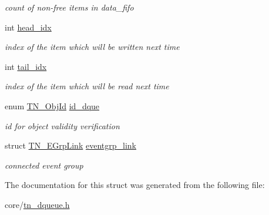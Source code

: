 \begin{DoxyCompactItemize}
\begin{DoxyCompactList}\small\item\em count of non-\/free items in {\ttfamily data\+\_\+fifo} \end{DoxyCompactList}\item 
\hypertarget{structTN__DQueue_a3451096f72cc02a2bed5573c2457323e}{int \hyperlink{structTN__DQueue_a3451096f72cc02a2bed5573c2457323e}{head\+\_\+idx}}\label{structTN__DQueue_a3451096f72cc02a2bed5573c2457323e}

\begin{DoxyCompactList}\small\item\em index of the item which will be written next time \end{DoxyCompactList}\item 
\hypertarget{structTN__DQueue_ab5451b7c143d4208c36d4227b79732a0}{int \hyperlink{structTN__DQueue_ab5451b7c143d4208c36d4227b79732a0}{tail\+\_\+idx}}\label{structTN__DQueue_ab5451b7c143d4208c36d4227b79732a0}

\begin{DoxyCompactList}\small\item\em index of the item which will be read next time \end{DoxyCompactList}\item 
\hypertarget{structTN__DQueue_afce2b73b8afc3b1537e34ff3a4a7114c}{enum \hyperlink{tn__common_8h_ae779dd1f6735f6e139fb70acd004d976}{T\+N\+\_\+\+Obj\+Id} \hyperlink{structTN__DQueue_afce2b73b8afc3b1537e34ff3a4a7114c}{id\+\_\+dque}}\label{structTN__DQueue_afce2b73b8afc3b1537e34ff3a4a7114c}

\begin{DoxyCompactList}\small\item\em id for object validity verification \end{DoxyCompactList}\item 
\hypertarget{structTN__DQueue_a4c7d686c2f9f6a6bc2f875e1c4849ae1}{struct \hyperlink{structTN__EGrpLink}{T\+N\+\_\+\+E\+Grp\+Link} \hyperlink{structTN__DQueue_a4c7d686c2f9f6a6bc2f875e1c4849ae1}{eventgrp\+\_\+link}}\label{structTN__DQueue_a4c7d686c2f9f6a6bc2f875e1c4849ae1}

\begin{DoxyCompactList}\small\item\em connected event group \end{DoxyCompactList}\end{DoxyCompactItemize}


The documentation for this struct was generated from the following file\+:\begin{DoxyCompactItemize}
\item 
core/\hyperlink{tn__dqueue_8h}{tn\+\_\+dqueue.\+h}\end{DoxyCompactItemize}
